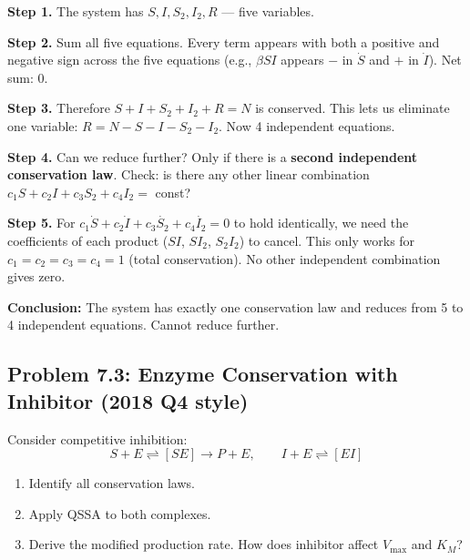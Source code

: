 \documentclass[10pt]{article}
\begin{document}
\begin{solution}
\textbf{Step 1.} The system has $S, I, S_2, I_2, R$ — five variables.

\textbf{Step 2.} Sum all five equations. Every term appears with both a positive and negative sign across the five equations (e.g., $\beta SI$ appears $-$ in $\dot S$ and $+$ in $\dot I$). Net sum: 0.

\textbf{Step 3.} Therefore $S + I + S_2 + I_2 + R = N$ is conserved. This lets us eliminate one variable: $R = N - S - I - S_2 - I_2$. Now 4 independent equations.

\textbf{Step 4.} Can we reduce further? Only if there is a \textbf{second independent conservation law}. Check: is there any other linear combination $c_1 S + c_2 I + c_3 S_2 + c_4 I_2 = $ const?

\textbf{Step 5.} For $c_1 \dot S + c_2 \dot I + c_3 \dot{S_2} + c_4 \dot{I_2} = 0$ to hold identically, we need the coefficients of each product ($SI$, $SI_2$, $S_2 I_2$) to cancel. This only works for $c_1 = c_2 = c_3 = c_4 = 1$ (total conservation). No other independent combination gives zero.

\textbf{Conclusion:} The system has exactly one conservation law and reduces from 5 to 4 independent equations. Cannot reduce further.
\end{solution}

\subsection{Problem 7.3: Enzyme Conservation with Inhibitor (2018 Q4 style)}

\begin{problem}
Consider competitive inhibition:
\[
S + E \rightleftharpoons [SE] \to P + E, \qquad I + E \rightleftharpoons [EI]
\]
\begin{enumerate}[label=(\alph*)]
\item Identify all conservation laws.
\item Apply QSSA to both complexes.
\item Derive the modified production rate. How does inhibitor affect $V_{\max}$ and $K_M$?
\end{enumerate}
\end{problem}
\end{document}
